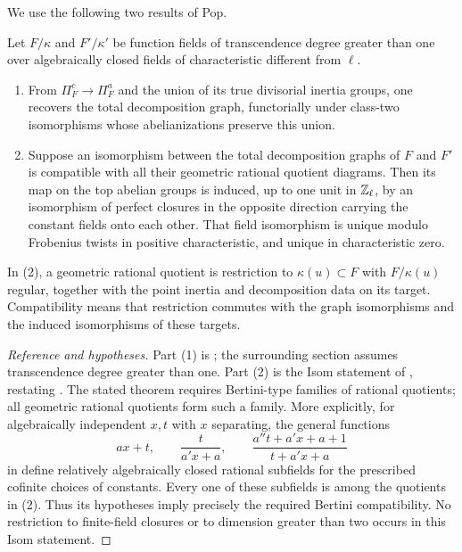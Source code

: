 We use the following two results of Pop.
\begin{proposition}
\label{reconstruction:pop}
Let $F/\kappa$ and $F'/\kappa'$ be function fields of transcendence
degree greater than one over algebraically closed fields of
characteristic different from $\ell$.
\begin{enumerate}
\item From $\Pi_F^c\to\Pi_F^a$ and the union of its true divisorial
inertia groups, one recovers the total decomposition graph, functorially
under class-two isomorphisms whose abelianizations preserve this union.
\item Suppose an isomorphism between the total decomposition graphs of
$F$ and $F'$ is compatible with all their geometric rational quotient
diagrams.  Then its map on the top abelian groups is induced, up to one
unit in $\mathbb Z_\ell$, by an isomorphism of perfect closures in the opposite
direction carrying the constant fields onto each other.  That field
isomorphism is unique modulo Frobenius twists in positive characteristic,
and unique in characteristic zero.
\end{enumerate}
In (2), a geometric rational quotient is restriction to
$\kappa(u)\subset F$ with $F/\kappa(u)$ regular, together with the
point inertia and decomposition data on its target.  Compatibility
means that restriction commutes with the graph isomorphisms and the
induced isomorphisms of these targets.
\end{proposition}
\begin{proof}[Reference and hypotheses]
Part (1) is \cite[Proposition~2.4]{Pop2018}; the surrounding section
assumes transcendence degree greater than one.  Part (2) is the Isom
statement of \cite[Theorem~2.1(2)]{PopBI2012}, restating
\cite[Main Theorem]{PopGraphs2012}.  The stated theorem requires
Bertini-type families of rational quotients; all geometric rational
quotients form such a family.  More explicitly, for algebraically
independent $x,t$ with $x$ separating, the general functions
\[
 ax+t,\qquad \frac{t}{a'x+a},\qquad
 \frac{a''t+a'x+a+1}{t+a'x+a}
\]
in \cite[Fact/Definition~43]{PopGraphs2012} define relatively
algebraically closed rational subfields for the prescribed cofinite
choices of constants.  Every one of these subfields is among the
quotients in (2).  Thus its hypotheses imply precisely the required
Bertini compatibility.  No restriction to finite-field closures or to
dimension greater than two occurs in this Isom statement.
\end{proof}

